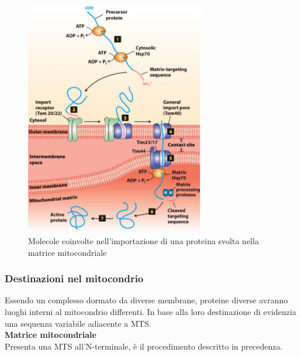         \begin{figure}[h]
            \centering
            \includegraphics[width=0.7\textwidth]{images/importMito.JPG}
            \caption{\small Molecole coinvolte nell'importazione di una proteina svolta nella matrice mitocondriale}
            \label{fig:mesh1}
        \end{figure}
        
        \subsubsection{Destinazioni nel mitocondrio}
            Essendo un complesso dormato da diverse membrane, proteine diverse avranno luoghi interni al mitocondrio differenti. In base alla loro destinazione di evidenzia una sequenza variabile adiacente a MTS.\\
            
            \textbf{Matrice mitocondriale}\\
                Presenta una MTS all'N-terminale, è il procedimento descritto in precedenza.\\
                
